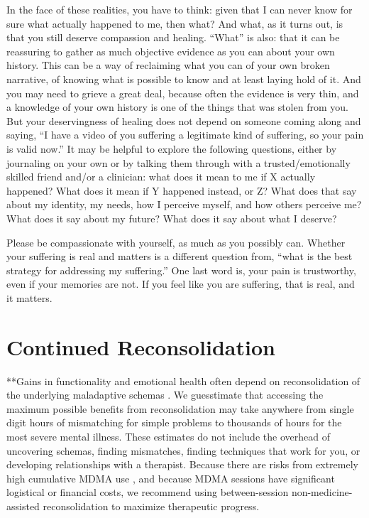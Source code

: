 \documentclass[12pt,letterpaper]{book}
\begin{document}
In the face of these realities, you have to think: given that I can never know for sure what actually happened to me, then what? And what, as it turns out, is that you still deserve compassion and healing. “What” is also: that it can be reassuring to gather as much objective evidence as you can about your own history. This can be a way of reclaiming what you can of your own broken narrative, of knowing what is possible to know and at least laying hold of it. And you may need to grieve a great deal, because often the evidence is very thin, and a knowledge of your own history is one of the things that was stolen from you. But your deservingness of healing does not depend on someone coming along and saying, “I have a video of you suffering a legitimate kind of suffering, so your pain is valid now.” It may be helpful to explore the following questions, either by journaling on your own or by talking them through with a trusted/emotionally skilled friend and/or a clinician: what does it mean to me if X actually happened? What does it mean if Y happened instead, or Z? What does that say about my identity, my needs, how I perceive myself, and how others perceive me? What does it say about my future? What does it say about what I deserve?

Please be compassionate with yourself, as much as you possibly can. Whether your suffering is real and matters is a different question from, “what is the best strategy for addressing my suffering.” One last word is, your pain is trustworthy, even if your memories are not. If you feel like you are suffering, that is real, and it matters.
\section{Continued Reconsolidation}
\label{sec:moreReconsolidation}
**Gains in functionality and emotional health often depend on reconsolidation of the underlying maladaptive schemas \cite{eckerUnlocking}. We guesstimate that accessing the maximum possible benefits from reconsolidation may take anywhere from single digit hours of mismatching for simple problems to thousands of hours for the most severe mental illness. These estimates do not include the overhead of uncovering schemas, finding mismatches, finding techniques that work for you, or developing relationships with a therapist. Because there are risks from extremely high cumulative MDMA use \cite{tagen2023valvular}, and because MDMA sessions have significant logistical or financial costs, we recommend using between-session non-medicine-assisted reconsolidation to maximize therapeutic progress.
\end{document}
